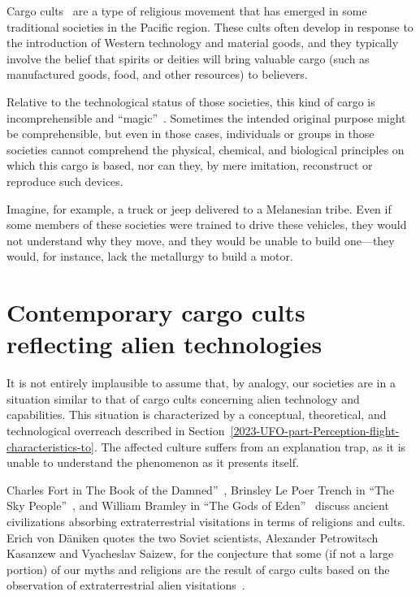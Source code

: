 Cargo cults~\cite{Worsley2009may,Lindstrom_2019} are a type of religious movement that has emerged in some traditional societies in the Pacific region.
These cults often develop in response to the introduction of Western technology and material goods, and they typically involve the belief that spirits or deities will bring valuable cargo
(such as manufactured goods, food, and other resources) to believers.

Relative to the technological status of those societies, this kind of cargo is incomprehensible and ``magic''~\cite{Clarke2000Jan}.
Sometimes the intended original purpose might be comprehensible, but even in those cases, individuals or groups in those societies
cannot comprehend the physical, chemical, and biological principles on which this cargo is based, nor can they, by mere imitation, reconstruct or reproduce such devices.

Imagine, for example, a truck or jeep delivered to a Melanesian tribe.
Even if some members of these societies were trained to drive these vehicles, they would not understand why they move,
and they would be unable to build one---they would, for instance, lack the metallurgy to build a motor.



\section{Contemporary cargo cults reflecting alien technologies}
\label{2023-UFO-part-Speculation-cargo-cults-ldl} %

It is not entirely implausible to assume that, by analogy, our societies are in a situation similar to that of cargo cults concerning alien technology and capabilities. This situation is characterized by a conceptual, theoretical, and technological overreach  described in Section~\ref{2023-UFO-part-Perception-flight-characteristics-to}. The affected culture suffers from an explanation trap, as it is unable to understand the phenomenon as it presents itself.

Charles Fort in The Book of the Damned''~\cite{FortBotD}, Brinsley Le Poer Trench in ``The Sky People''~\cite{lePoerTrench1961Jan},
and William Bramley in ``The Gods of Eden''~\cite{Bramley1993Mar} discuss ancient civilizations absorbing
extraterrestrial visitations in terms of religions and cults. Erich von D\"aniken quotes the two Soviet scientists,
Alexander Petrowitsch Kasanzew and Vyacheslav Saizew,
for the conjecture that some (if not a large portion) of our myths and religions are the result of cargo cults based on the
observation of extraterrestrial alien visitations~\cite{vonDaeniken1970}.

